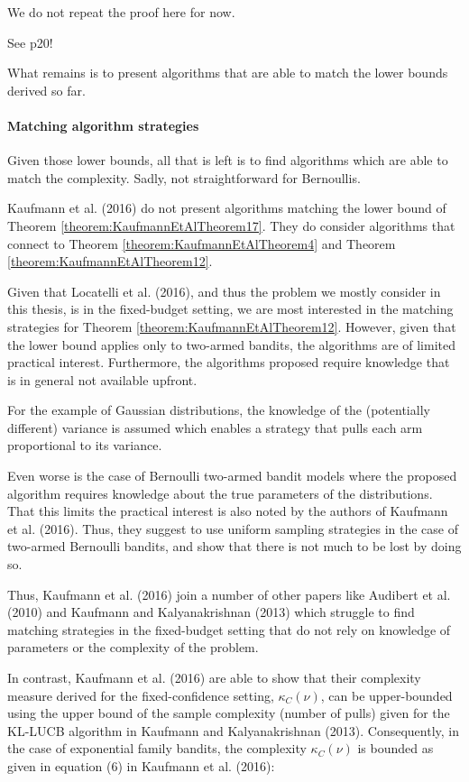 \documentclass[12pt,]{article}
\let\oldparagraph\paragraph
\renewcommand{\paragraph}[1]{\oldparagraph{#1}\mbox{}}
\begin{document}
We do not repeat the proof here for now.

See p20!

What remains is to present algorithms that are able to match the lower
bounds derived so far.

\paragraph{Matching algorithm
strategies}\label{matching-algorithm-strategies}

Given those lower bounds, all that is left is to find algorithms which
are able to match the complexity. Sadly, not straightforward for
Bernoullis.

Kaufmann et al. (2016) do not present algorithms matching the lower
bound of Theorem \ref{theorem:KaufmannEtAlTheorem17}. They do consider
algorithms that connect to Theorem \ref{theorem:KaufmannEtAlTheorem4}
and Theorem \ref{theorem:KaufmannEtAlTheorem12}.

Given that Locatelli et al. (2016), and thus the problem we mostly
consider in this thesis, is in the fixed-budget setting, we are most
interested in the matching strategies for Theorem
\ref{theorem:KaufmannEtAlTheorem12}. However, given that the lower bound
applies only to two-armed bandits, the algorithms are of limited
practical interest. Furthermore, the algorithms proposed require
knowledge that is in general not available upfront.

For the example of Gaussian distributions, the knowledge of the
(potentially different) variance is assumed which enables a strategy
that pulls each arm proportional to its variance.

Even worse is the case of Bernoulli two-armed bandit models where the
proposed algorithm requires knowledge about the true parameters of the
distributions. That this limits the practical interest is also noted by
the authors of Kaufmann et al. (2016). Thus, they suggest to use uniform
sampling strategies in the case of two-armed Bernoulli bandits, and show
that there is not much to be lost by doing so.

Thus, Kaufmann et al. (2016) join a number of other papers like Audibert
et al. (2010) and Kaufmann and Kalyanakrishnan (2013) which struggle to
find matching strategies in the fixed-budget setting that do not rely on
knowledge of parameters or the complexity of the problem.

In contrast, Kaufmann et al. (2016) are able to show that their
complexity measure derived for the fixed-confidence setting,
\(\kappa_C(\nu)\), can be upper-bounded using the upper bound of the
sample complexity (number of pulls) given for the KL-LUCB algorithm in
Kaufmann and Kalyanakrishnan (2013). Consequently, in the case of
exponential family bandits, the complexity \(\kappa_C(\nu)\) is bounded
as given in equation (6) in Kaufmann et al. (2016):
\end{document}
